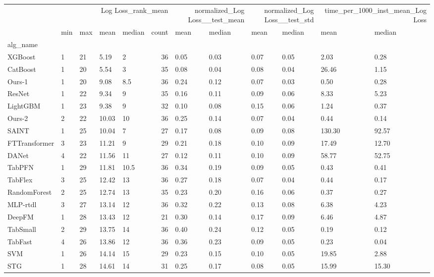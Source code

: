 \begin{tabular}{lllllrllllll}
\toprule
 & \multicolumn{5}{r}{Log Loss_rank_mean} & \multicolumn{2}{r}{normalized_Log Loss__test_mean} & \multicolumn{2}{r}{normalized_Log Loss__test_std} & \multicolumn{2}{r}{time_per_1000_inst_mean_Log Loss} \\
 & min & max & mean & median & count & mean & median & mean & median & mean & median \\
alg_name &  &  &  &  &  &  &  &  &  &  &  \\
\midrule
XGBoost & 1 & 21 & 5.19 & 2 & 36 & 0.05 & 0.03 & 0.07 & 0.05 & 2.03 & 0.28 \\
CatBoost & 1 & 20 & 5.54 & 3 & 35 & 0.08 & 0.04 & 0.08 & 0.04 & 26.46 & 1.15 \\
Ours-1 & 1 & 20 & 9.08 & 8.5 & 36 & 0.24 & 0.12 & 0.07 & 0.03 & 0.50 & 0.28 \\
ResNet & 1 & 22 & 9.34 & 9 & 35 & 0.16 & 0.11 & 0.09 & 0.06 & 8.33 & 5.23 \\
LightGBM & 1 & 23 & 9.38 & 9 & 32 & 0.10 & 0.08 & 0.15 & 0.06 & 1.24 & 0.37 \\
Ours-2 & 2 & 22 & 10.03 & 10 & 36 & 0.25 & 0.14 & 0.07 & 0.04 & 0.44 & 0.14 \\
SAINT & 1 & 25 & 10.04 & 7 & 27 & 0.17 & 0.08 & 0.09 & 0.08 & 130.30 & 92.57 \\
FTTransformer & 3 & 23 & 11.21 & 9 & 29 & 0.21 & 0.18 & 0.10 & 0.09 & 17.49 & 12.70 \\
DANet & 4 & 22 & 11.56 & 11 & 27 & 0.12 & 0.11 & 0.10 & 0.09 & 58.77 & 52.75 \\
TabPFN & 1 & 29 & 11.81 & 10.5 & 36 & 0.34 & 0.19 & 0.09 & 0.05 & 0.43 & 0.41 \\
TabFlex & 3 & 25 & 12.42 & 13 & 36 & 0.27 & 0.18 & 0.07 & 0.04 & 0.44 & 0.17 \\
RandomForest & 2 & 25 & 12.74 & 13 & 35 & 0.23 & 0.20 & 0.16 & 0.06 & 0.37 & 0.27 \\
MLP-rtdl & 3 & 27 & 13.14 & 12 & 36 & 0.32 & 0.22 & 0.13 & 0.08 & 6.38 & 4.23 \\
DeepFM & 1 & 28 & 13.43 & 12 & 21 & 0.30 & 0.14 & 0.17 & 0.09 & 6.46 & 4.87 \\
TabSmall & 2 & 29 & 13.75 & 14 & 36 & 0.40 & 0.24 & 0.12 & 0.05 & 0.19 & 0.12 \\
TabFast & 4 & 26 & 13.86 & 12 & 36 & 0.36 & 0.23 & 0.09 & 0.05 & 0.23 & 0.04 \\
SVM & 1 & 26 & 14.14 & 15 & 29 & 0.23 & 0.15 & 0.10 & 0.05 & 19.85 & 2.88 \\
STG & 1 & 28 & 14.61 & 14 & 31 & 0.25 & 0.17 & 0.08 & 0.05 & 15.99 & 15.30 \\

\end{tabular}
